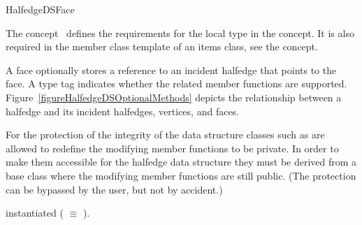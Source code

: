 
\ccRefPageBegin



\begin{ccRefConcept}{HalfedgeDSFace}
\label{pageHalfedgeDSItemsFaceRef}

\ccDefinition
  
The concept \ccRefName\ defines the requirements for the local  
type in the  concept. It is also required in 
the  member class template of an
items class, see the  concept.

A face optionally stores a reference to an incident halfedge that
points to the face.  A type tag indicates whether the related member
functions are supported. 
Figure~\ref{figureHalfedgeDSOptionalMethods} 
depicts the relationship between a halfedge and its incident
halfedges, vertices, and faces.

For the protection of the integrity of the data structure classes such as
 are allowed to redefine the modifying member 
functions to be private. In order to make them accessible for the 
halfedge data structure they must be derived from a base class 
where the modifying member functions are still public. (The protection
can be bypassed by the user, but not by accident.)

\ccTypes

\ccThreeToTwo

    {instantiated  ( $\equiv$ ).}
\ccGlue
{}
\ccGlue
{}
\ccGlue
{}
\ccGlue
{}
\ccGlue
{}
\ccGlue
{}
\ccGlue
{}
\ccGlue
{}
\ccGlue
{}
\ccGlue
{}


\end{ccRefConcept}
